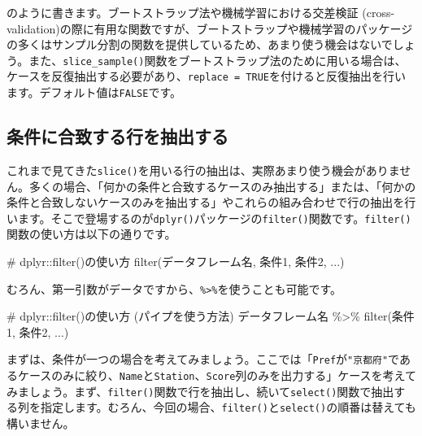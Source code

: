 \documentclass[
  a4paper,
  pandoc,
  ja=standard,
  jafont=haranoaji]{bxjsbook}
\newenvironment{Shaded}{\begin{snugshade}}{\end{snugshade}}
\newcommand{\CommentTok}[1]{\textcolor[rgb]{0.37,0.37,0.37}{#1}}
\newcommand{\FunctionTok}[1]{\textcolor[rgb]{0.28,0.35,0.67}{#1}}
\newcommand{\NormalTok}[1]{\textcolor[rgb]{0.00,0.48,0.65}{#1}}
\newcommand{\SpecialCharTok}[1]{\textcolor[rgb]{0.37,0.37,0.37}{#1}}
\begin{document}
のように書きます。ブートストラップ法や機械学習における交差検証
(cross-validation)の際に有用な関数ですが、ブートストラップや機械学習のパッケージの多くはサンプル分割の関数を提供しているため、あまり使う機会はないでしょう。また、\texttt{slice\_sample()}関数をブートストラップ法のために用いる場合は、ケースを反復抽出する必要があり、\texttt{replace\ =\ TRUE}を付けると反復抽出を行います。デフォルト値は\texttt{FALSE}です。

\hypertarget{ux6761ux4ef6ux306bux5408ux81f4ux3059ux308bux884cux3092ux62bdux51faux3059ux308b}{%
\subsection{条件に合致する行を抽出する}\label{ux6761ux4ef6ux306bux5408ux81f4ux3059ux308bux884cux3092ux62bdux51faux3059ux308b}}

これまで見てきた\texttt{slice()}を用いる行の抽出は、実際あまり使う機会がありません。多くの場合、「何かの条件と合致するケースのみ抽出する」または、「何かの条件と合致しないケースのみを抽出する」やこれらの組み合わせで行の抽出を行います。そこで登場するのが\texttt{dplyr()}パッケージの\texttt{filter()}関数です。\texttt{filter()}関数の使い方は以下の通りです。

\begin{Shaded}
\begin{Highlighting}[numbers=left,,]
\CommentTok{\# dplyr::filter()の使い方}
\FunctionTok{filter}\NormalTok{(データフレーム名, 条件1, 条件2, ...)}
\end{Highlighting}
\end{Shaded}

むろん、第一引数がデータですから、\texttt{\%\textgreater{}\%}を使うことも可能です。

\begin{Shaded}
\begin{Highlighting}[numbers=left,,]
\CommentTok{\# dplyr::filter()の使い方 (パイプを使う方法)}
\NormalTok{データフレーム名 }\SpecialCharTok{\%\textgreater{}\%}
  \FunctionTok{filter}\NormalTok{(条件1, 条件2, ...)}
\end{Highlighting}
\end{Shaded}

まずは、条件が一つの場合を考えてみましょう。ここでは「\texttt{Pref}が\texttt{"京都府"}であるケースのみに絞り、\texttt{Name}と\texttt{Station}、\texttt{Score}列のみを出力する」ケースを考えてみましょう。まず、\texttt{filter()}関数で行を抽出し、続いて\texttt{select()}関数で抽出する列を指定します。むろん、今回の場合、\texttt{filter()}と\texttt{select()}の順番は替えても構いません。
\end{document}
